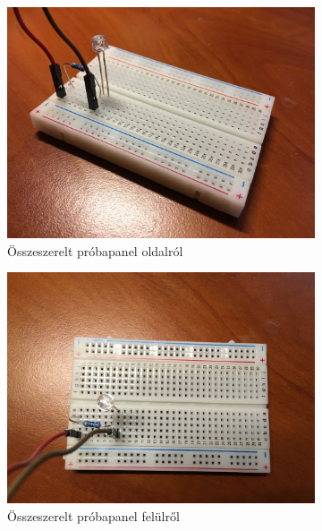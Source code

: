 \documentclass[a4paper,12pt]{report}
\begin{document}
\begin{figure}[h!]
    \centering
    \begin{subfigure}[b]{0.4\linewidth}
        \includegraphics[width=\linewidth]{images/osszeszerelt1.jpg}
        \caption{Összeszerelt próbapanel oldalról}
    \end{subfigure}
    \begin{subfigure}[b]{0.4\linewidth}
        \includegraphics[width=\linewidth]{images/osszeszerelt2.jpg}
        \caption{Összeszerelt próbapanel felülről}
    \end{subfigure}
    \begin{subfigure}[b]{0.5\linewidth}

\end{subfigure}
\end{figure}
\end{document}
